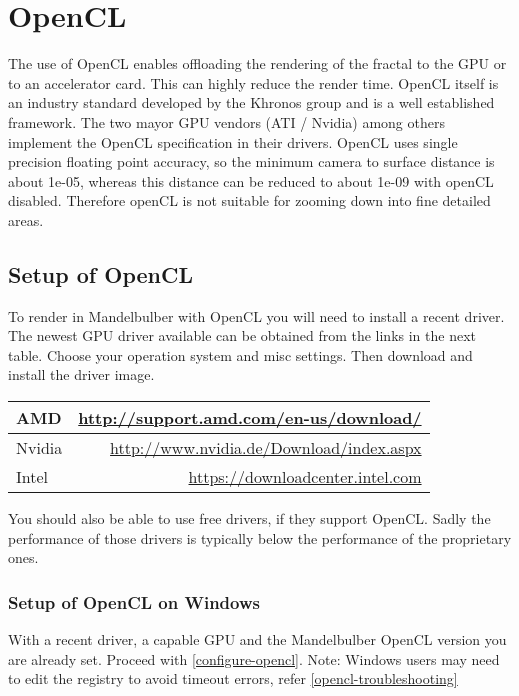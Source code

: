 

\section{OpenCL}\label{opencl}

The use of OpenCL  enables offloading the rendering of the fractal to the
GPU or to an accelerator card. This can highly reduce the render time.
OpenCL itself is an industry standard developed by the Khronos group and
is a well established framework. The two mayor GPU vendors (ATI / Nvidia)
among others implement the OpenCL specification in their drivers.
OpenCL uses single precision floating point accuracy, so the minimum camera to surface distance is about 1e-05, whereas  this distance can be reduced to about 1e-09 with openCL disabled. Therefore openCL is not suitable for zooming down into fine detailed areas.

\subsection{Setup of OpenCL}\label{setup-opencl}
To render in Mandelbulber with OpenCL you will need to install a recent driver.
The newest GPU driver available can be obtained from the links in the next table.
Choose your operation system and misc settings.
Then download and install the driver image.

\begin{center}
	\begin{tabular}{ | l | r | }
		\hline
		AMD 	&
		\href{http://support.amd.com/en-us/download/}{http://support.amd.com/en-us/download/}
		\\ \hline
		Nvidia 	& 
		\href{http://www.nvidia.de/Download/index.aspx}{http://www.nvidia.de/Download/index.aspx}
		\\ \hline
		Intel	&
		\href{https://downloadcenter.intel.com}{https://downloadcenter.intel.com}
		\\ \hline
	\end{tabular}
\end{center}

You should also be able to use free drivers, if they support OpenCL.
Sadly the performance of those drivers is typically below the performance of the proprietary ones.

\subsubsection{Setup of OpenCL on Windows}\label{setup-opencl-windows}
With a recent driver, a capable GPU and the Mandelbulber OpenCL version you are already set.
Proceed with \ref{configure-opencl}. Note: Windows users may need to edit the registry to avoid timeout errors, refer \ref{opencl-troubleshooting}

